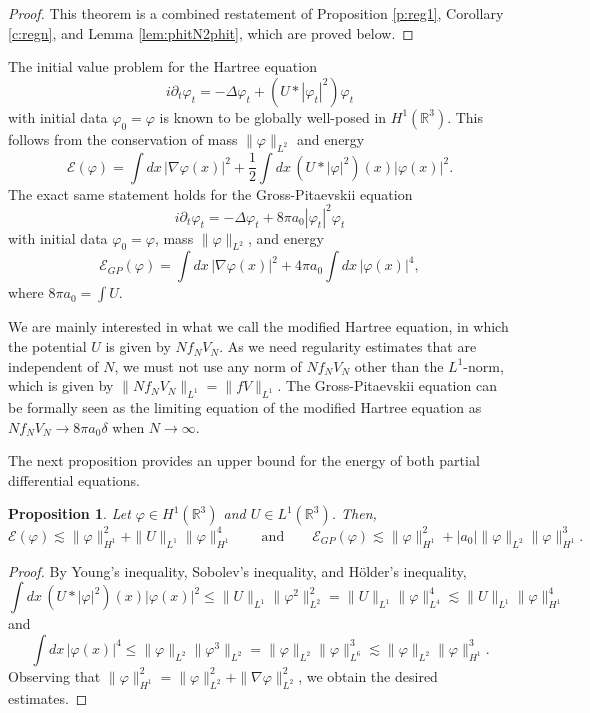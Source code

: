 \documentclass[11pt,a4paper,DIV11]{scrartcl}	%
\newtheorem{prp}[thm]{Proposition}
\newcommand{\R}{\mathds{R}}
\newcommand{\norm}[1]{\lVert#1\rVert}	%
\begin{document}
\begin{proof}
  This theorem is a combined restatement of Proposition \ref{p:reg1},
  Corollary \ref{c:regn}, and Lemma \ref{lem:phitN2phit}, which are proved
  below.
\end{proof}


The initial value problem for the Hartree equation
\[
  i \partial_t \varphi_t = - \Delta \varphi_t + (U * |\varphi_t|^2)
  \varphi_t
\]
with initial data $\varphi_0 = \varphi$ is known to be globally well-posed
in $H^1(\R^3)$. This follows from the conservation of mass $\| \varphi
\|_{L^2}$ and energy
\[
  \mathcal{E}(\varphi) = \int dx \, |\nabla \varphi(x)|^2 + \frac{1}{2} \int
  dx \, (U * |\varphi|^2)(x) |\varphi(x)|^2.
\]
The exact same statement holds for the Gross-Pitaevskii equation
\[
  i \partial_t \varphi_t = - \Delta \varphi_t + 8 \pi a_0 |\varphi_t|^2
  \varphi_t
\]
with initial data $\varphi_0 = \varphi$, mass $\| \varphi \|_{L^2}$, and
energy
\[
  \mathcal{E}_{GP}(\varphi) = \int dx \, |\nabla \varphi(x)|^2 + 4 \pi a_0
  \int dx \, |\varphi(x)|^4,
\]
where $8 \pi a_0 = \int U$.


We are mainly interested in what we call the modified Hartree equation, in
which the potential $U$ is given by $N f_N V_N$. As we need regularity
estimates that are independent of $N$, we must not use any norm of
$N f_N V_N$ other than
the $L^1$-norm, which is given by $\norm{N f_N V_N}_{L^1} = \| fV \|_{L^1}$.
The Gross-Pitaevskii equation can be formally seen as the limiting equation of the modified Hartree
equation as $N f_N V_N \to 8 \pi a_0 \delta$ when $N \to \infty$.


The next proposition provides an upper bound for the energy of both partial
differential equations.


\begin{prp} \label{p:energy}
  Let $\varphi \in H^1(\R^3)$ and $U \in L^1(\R^3)$. Then,
  \[
    \mathcal{E}(\varphi) \apprle \| \varphi \|_{H^1}^2 + \| U \|_{L^1} \|
    \varphi \|_{H^1}^4 \qquad \text{and} \qquad \mathcal{E}_{GP}(\varphi)
    \apprle \| \varphi \|_{H^1}^2 + |a_0| \| \varphi \|_{L^2} \| \varphi
    \|_{H^1}^3.
  \]
\end{prp}


\begin{proof}
  By Young's inequality, Sobolev's inequality, and H\"older's inequality, 
  \[
    \int dx \, (U * |\varphi|^2)(x) |\varphi(x)|^2 \le \| U \|_{L^1} \|
    \varphi^2 \|_{L^2}^2 = \| U \|_{L^1} \| \varphi \|_{L^4}^4 \apprle \| U
    \|_{L^1} \| \varphi \|_{H^1}^4
  \]
  and
  \[
    \int dx \, |\varphi(x)|^4 \le \| \varphi \|_{L^2} \| \varphi^3 \|_{L^2} =
    \| \varphi \|_{L^2} \| \varphi \|_{L^6}^3 \apprle \| \varphi \|_{L^2} \|
    \varphi \|_{H^1}^3.
  \]
  Observing that $\| \varphi \|_{H^1}^2 = \| \varphi \|_{L^2}^2 + \| \nabla
  \varphi \|_{L^2}^2$, we obtain the desired estimates.
\end{proof}
\end{document}
